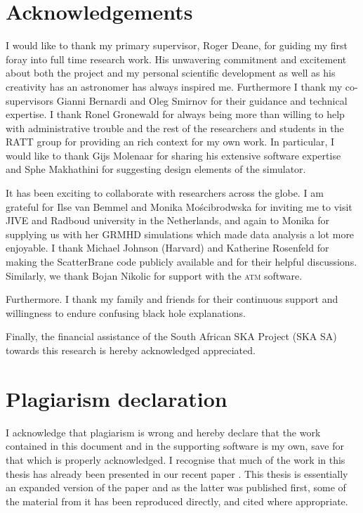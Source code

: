 
 
\chapter*{Acknowledgements}
I would like to thank my primary supervisor, Roger Deane, for guiding my first foray into full time research work. His unwavering commitment and excitement about both the project and my personal scientific development as well as his creativity has an astronomer has always inspired me. Furthermore I thank my co-supervisors Gianni Bernardi and Oleg Smirnov for their guidance and technical expertise. I thank Ronel Gronewald for always being more than willing to help with administrative trouble and the rest of the researchers and students in the RATT group for providing an rich context for my own work. In particular, I would like to thank Gijs Molenaar for sharing his extensive software expertise and Sphe Makhathini for suggesting design elements of the simulator. 


It has been exciting to collaborate with researchers across the globe. I am grateful for Ilse van Bemmel and Monika Mo\'{s}cibrodwska for inviting me to visit JIVE and Radboud university in the Netherlands, and again to Monika for supplying us with her GRMHD simulations which made data analysis a lot more enjoyable. I thank Michael Johnson (Harvard) and Katherine Rosenfeld for making the {\sc ScatterBrane} code publicly available and for their helpful discussions. Similarly, we thank Bojan Nikolic for support with the \textsc{atm} software.  

Furthermore. I thank my family and friends for their continuous support and willingness to endure confusing black hole explanations.

Finally, the financial assistance of the South African SKA Project (SKA SA) towards this research is hereby acknowledged appreciated. 

\chapter*{Plagiarism declaration}
 I acknowledge that plagiarism is wrong and hereby declare that the work contained in this document and in the supporting software is my own, save for that which is properly acknowledged. I recognise that much of the work in this thesis has already been presented in our recent paper \citet{Blecher_2016}. This thesis is essentially an expanded version of the paper and as the latter was published first, some of the material from it has been reproduced directly, and cited where appropriate. 
 \vspace{55pt}
 
